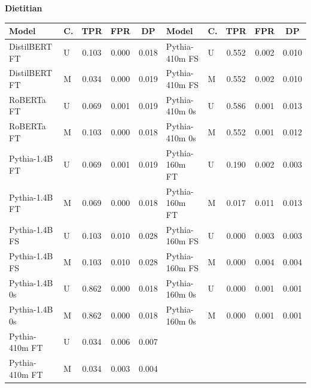 \documentclass[11pt]{article}
\begin{document}
\vspace{4pt}\noindent\textbf{Dietitian}
\begin{center}\scriptsize
\begin{tabular}{llccc|llccc}
\toprule
\textbf{Model} & \textbf{C.} & \textbf{TPR} & \textbf{FPR} & \textbf{DP} & \textbf{Model} & \textbf{C.} & \textbf{TPR} & \textbf{FPR} & \textbf{DP} \\
\midrule
DistilBERT FT & U & 0.103 & 0.000 & 0.018 & Pythia-410m FS & U & 0.552 & 0.002 & 0.010 \\
DistilBERT FT & M & 0.034 & 0.000 & 0.019 & Pythia-410m FS & M & 0.552 & 0.002 & 0.010 \\
RoBERTa FT & U & 0.069 & 0.001 & 0.019 & Pythia-410m 0s & U & 0.586 & 0.001 & 0.013 \\
RoBERTa FT & M & 0.103 & 0.000 & 0.018 & Pythia-410m 0s & M & 0.552 & 0.001 & 0.012 \\
Pythia-1.4B FT & U & 0.069 & 0.001 & 0.019 & Pythia-160m FT & U & 0.190 & 0.002 & 0.003 \\
Pythia-1.4B FT & M & 0.069 & 0.000 & 0.018 & Pythia-160m FT & M & 0.017 & 0.011 & 0.013 \\
Pythia-1.4B FS & U & 0.103 & 0.010 & 0.028 & Pythia-160m FS & U & 0.000 & 0.003 & 0.003 \\
Pythia-1.4B FS & M & 0.103 & 0.010 & 0.028 & Pythia-160m FS & M & 0.000 & 0.004 & 0.004 \\
Pythia-1.4B 0s & U & 0.862 & 0.000 & 0.018 & Pythia-160m 0s & U & 0.000 & 0.001 & 0.001 \\
Pythia-1.4B 0s & M & 0.862 & 0.000 & 0.018 & Pythia-160m 0s & M & 0.000 & 0.001 & 0.001 \\
Pythia-410m FT & U & 0.034 & 0.006 & 0.007 & & & & & \\
Pythia-410m FT & M & 0.034 & 0.003 & 0.004 & & & & & \\
\bottomrule
\end{tabular}
\end{center}
\end{document}
